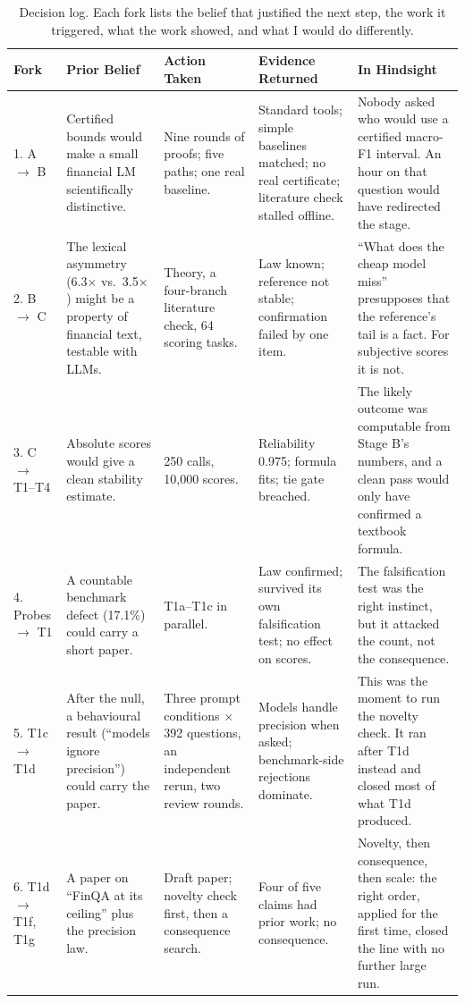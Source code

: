 \documentclass[11pt]{article}
\begin{document}
\begin{table}[!t]
\centering
\scriptsize
\renewcommand{\arraystretch}{1.18}
\begin{tabularx}{\textwidth}{@{}L{1.55cm}YYYY@{}}
\toprule
\textbf{Fork} & \textbf{Prior Belief} & \textbf{Action Taken} & \textbf{Evidence Returned} & \textbf{In Hindsight} \\
. A $\to$ B & Certified bounds would make a small financial LM scientifically distinctive. & Nine rounds of proofs; five paths; one real baseline. & Standard tools; simple baselines matched; no real certificate; literature check stalled offline. & Nobody asked who would use a certified macro-F1 interval. An hour on that question would have redirected the stage. \\
2. B $\to$ C & The lexical asymmetry (6.3$\times$ vs.\ 3.5$\times$) might be a property of financial text, testable with LLMs. & Theory, a four-branch literature check, 64 scoring tasks. & Law known; reference not stable; confirmation failed by one item. & ``What does the cheap model miss'' presupposes that the reference's tail is a fact. For subjective scores it is not. \\
3. C $\to$ T1--T4 & Absolute scores would give a clean stability estimate. & 250 calls, 10,000 scores. & Reliability 0.975; formula fits; tie gate breached. & The likely outcome was computable from Stage B's numbers, and a clean pass would only have confirmed a textbook formula. \\
4. Probes $\to$ T1 & A countable benchmark defect (17.1\%) could carry a short paper. & T1a--T1c in parallel. & Law confirmed; survived its own falsification test; no effect on scores. & The falsification test was the right instinct, but it attacked the count, not the consequence. \\
5. T1c $\to$ T1d & After the null, a behavioural result (``models ignore precision'') could carry the paper. & Three prompt conditions $\times$ 392 questions, an independent rerun, two review rounds. & Models handle precision when asked; benchmark-side rejections dominate. & This was the moment to run the novelty check. It ran after T1d instead and closed most of what T1d produced. \\
6. T1d $\to$ T1f, T1g & A paper on ``FinQA at its ceiling'' plus the precision law. & Draft paper; novelty check first, then a consequence search. & Four of five claims had prior work; no consequence. & Novelty, then consequence, then scale: the right order, applied for the first time, closed the line with no further large run. \\
\bottomrule
\end{tabularx}
\caption{Decision log. Each fork lists the belief that justified the next step, the work it triggered, what the work showed, and what I would do differently.}
\label{tab:decisions}
\end{table}
\end{document}
